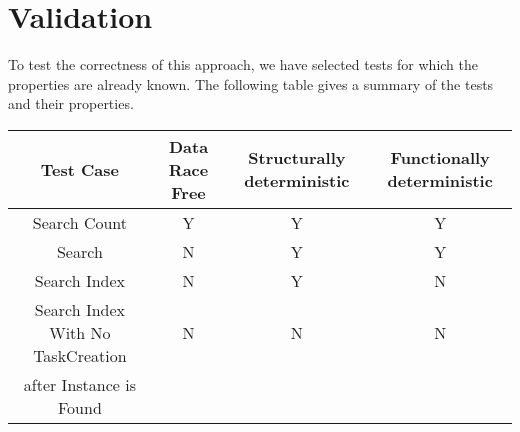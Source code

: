 \section{Validation}
To test the correctness of this approach, we have selected tests for which the properties are already known. The following table gives a summary of the tests and their properties. \\

\begin{tabular}{ | c | c | c | c |}
  \hline
  Test Case & Data Race Free & Structurally deterministic & Functionally deterministic \\
  \hline
  Search Count & Y & Y & Y \\
  \hline
  Search & N & Y & Y \\
  \hline
  Search Index & N & Y & N\\
  \hline 
  Search Index With No TaskCreation & N & N & N\\
   after Instance is Found  & & & \\
  \hline 
\end{tabular}